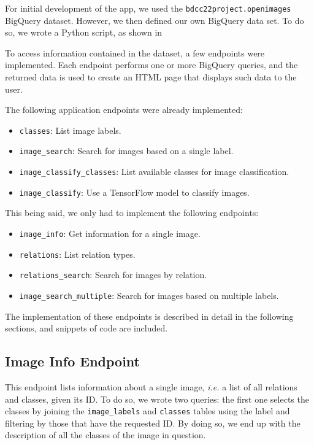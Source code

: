 \documentclass[a4paper, 11pt]{article}
\begin{document}
For initial development of the app, we used the \texttt{bdcc22project.openimages} BigQuery dataset. 
However, we then defined our own BigQuery data set. To do so, we wrote a Python script, as shown in 

To access information contained in the dataset, a few endpoints were implemented. Each endpoint 
performs one or more BigQuery queries, and the returned data is used to create an HTML page that 
displays such data to the user.

The following application endpoints were already implemented:

\begin{itemize}
    \item \texttt{classes}: List image labels.
    \item \texttt{image\_search}: Search for images based on a single label.	
    \item \texttt{image\_classify\_classes}: List available classes for image classification.	
    \item \texttt{image\_classify}: Use a TensorFlow model to classify images.	
\end{itemize}

This being said, we only had to implement the following endpoints:

\begin{itemize}
    \item \texttt{image\_info}: Get information for a single image.
    \item \texttt{relations}: List relation types.
    \item \texttt{relations\_search}: Search for images by relation.
    \item \texttt{image\_search\_multiple}: Search for images based on multiple labels.
\end{itemize}

The implementation of these endpoints is described in detail in the following sections, and 
snippets of code are included.

\subsection{Image Info Endpoint}

This endpoint lists information about a single image, \textit{i.e.} a list of all relations and 
classes, given its ID. To do so, we wrote two queries: the first one selects the classes by joining 
the \texttt{image\_labels} and \texttt{classes} tables using the label and filtering by those that 
have the requested ID. By doing so, we end up with the description of all the classes of the image 
in question.
\end{document}
